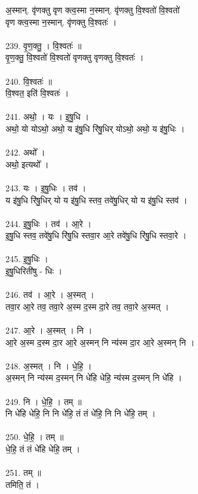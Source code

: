 अ॒स्मान्. वृ॑णक्तु वृण क्त्व॒स्मा न॒स्मान्. वृ॑णक्तु वि॒श्वतो॑ वि॒श्वतो॑\\
वृण क्त्व॒स्मा न॒स्मान्. वृ॑णक्तु वि॒श्वतः॑ ।\\
\\
239. वृ॒ण॒क्तु॒ । वि॒श्वतः॑ ॥\\
वृ॒ण॒क्तु॒ वि॒श्वतो॑ वि॒श्वतो॑ वृणक्तु वृणक्तु वि॒श्वतः॑ ।\\
\\
240. वि॒श्वतः॑ ॥\\
वि॒श्वत॒ इति॑ वि॒श्वतः॑ ।\\
\\
241. अथो॒ । यः । इ॒षु॒धि ।\\
अथो॒ यो योऽथो॒ अथो॒ य इ॑षु॒धि रि॑षु॒धिर् योऽथो॒ अथो॒ य इ॑षु॒धिः ।\\
\\
242. अथो᳚ ।\\
अथो॒ इत्यथो᳚ ।\\
\\
243. यः । इ॒षु॒धिः । तव॑ ।\\
य इ॑षु॒धि रि॑षु॒धिर् यो य इ॑षु॒धि स्तव॒ तवे॑षु॒धिर् यो य इ॑षु॒धि स्तव॑ ।\\
\\
244. इ॒षु॒धिः । तव॑ । आ॒रे ।\\
इ॒षु॒धि स्तव॒ तवे॑षु॒धि रि॑षु॒धि स्तवा॒र आ॒रे तवे॑षु॒धि रि॑षु॒धि स्तवा॒रे ।\\
\\
245. इ॒षु॒धिः ।\\
इ॒षु॒धिरिती॑षु - धिः ।\\
\\
246. तव॑ । आ॒रे । अ॒स्मत् ।\\
तवा॒र आ॒रे तव॒ तवा॒रे अ॒स्म द॒स्म दा॒रे तव॒ तवा॒रे अ॒स्मत् ।\\
\\
247. आ॒रे । अ॒स्मत् । नि ।\\
आ॒रे अ॒स्म द॒स्म दा॒र आ॒रे अ॒स्मन् नि न्य॑स्म दा॒र आ॒रे अ॒स्मन् नि ।\\
\\
248. अ॒स्मत् । नि । धे॒हि॒ ।\\
अ॒स्मन् नि न्य॑स्म द॒स्मन् नि धे॑हि धेहि॒ न्य॑स्म द॒स्मन् नि धे॑हि ।\\
\\
249. नि । धे॒हि॒ । तम् ॥\\
नि धे॑हि धेहि॒ नि नि धे॑हि॒ तं तं धे॑हि॒ नि नि धे॑हि॒ तम् ।\\
\\
250. धे॒हि॒ । तम् ॥\\
धे॒हि॒ तं तं धे॑हि धेहि॒ तम् ।\\
\\
251. तम् ॥\\
तमिति॒ तं ।\\
